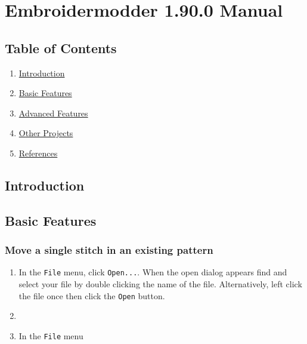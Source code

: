 \hypertarget{embroidermodder-1.90.0-manual}{%
\section{Embroidermodder 1.90.0
Manual}\label{embroidermodder-1.90.0-manual}}

\hypertarget{table-of-contents}{%
\subsection{Table of Contents}\label{table-of-contents}}

\begin{enumerate}
\def\labelenumi{\arabic{enumi}.}
\tightlist
\item
  \protect\hyperlink{introduction}{Introduction}
\item
  \protect\hyperlink{basic-features}{Basic Features}
\item
  \protect\hyperlink{advanced-features}{Advanced Features}
\item
  \protect\hyperlink{other-projects}{Other Projects}
\item
  \protect\hyperlink{References}{References}
\end{enumerate}

\hypertarget{introduction}{%
\subsection{Introduction}\label{introduction}}

\hypertarget{basic-features}{%
\subsection{Basic Features}\label{basic-features}}

\hypertarget{move-a-single-stitch-in-an-existing-pattern}{%
\subsubsection{Move a single stitch in an existing
pattern}\label{move-a-single-stitch-in-an-existing-pattern}}

\begin{enumerate}
\def\labelenumi{\arabic{enumi}.}
\tightlist
\item
  In the \texttt{File} menu, click \texttt{Open...}. When the open
  dialog appears find and select your file by double clicking the name
  of the file. Alternatively, left click the file once then click the
  \texttt{Open} button.
\item
\item
  In the \texttt{File} menu
\end{enumerate}

